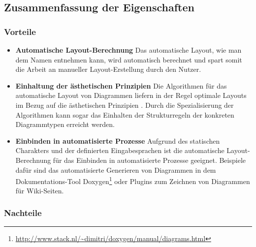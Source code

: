 \subsection{Zusammenfassung der Eigenschaften}
\label{subsec:summary-automatic-layout}

\subsubsection{Vorteile}

\begin{itemize}
    \item \textbf{Automatische Layout-Berechnung} Das automatische Layout, wie man dem Namen entnehmen kann, wird automatisch berechnet und spart somit die Arbeit an manueller Layout-Erstellung durch den Nutzer. 
    \item \textbf{Einhaltung der ästhetischen Prinzipien} Die Algorithmen für das automatische Layout von Diagrammen liefern in der Regel optimale Layouts im Bezug auf die ästhetischen Prinzipien \cite{Maier12A-Pattern-based}. Durch die Spezialisierung der Algorithmen kann sogar das Einhalten der Strukturregeln der konkreten Diagrammtypen erreicht werden.
    \item \textbf{Einbinden in automatisierte Prozesse} Aufgrund des statischen Charakters und der definierten Eingabesprachen ist die automatische Layout-Berechnung für das Einbinden in automatisierte Prozesse geeignet. Beispiele dafür sind das automatisierte Generieren von Diagrammen in dem Dokumentations-Tool Doxygen\footnote{\url{http://www.stack.nl/~dimitri/doxygen/manual/diagrams.html}} oder Plugins zum Zeichnen von Diagrammen für Wiki-Seiten.
\end{itemize}

\subsubsection{Nachteile}

